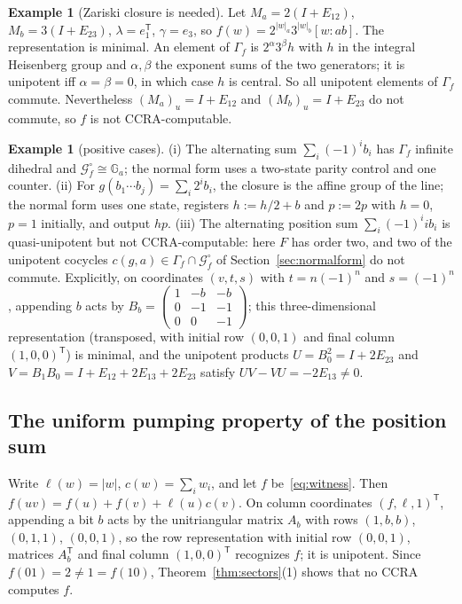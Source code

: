 \documentclass[acmlarge,screen,11pt,nonacm,natbib=false]{acmart}
\newcommand{\cG}{\mathcal{G}}
\theoremstyle{definition}
\newtheorem{example}[theorem]{Example}
\begin{document}
\begin{example}[Zariski closure is needed]\label{ex:heis}
Let $M_a=2(I+E_{12})$, $M_b=3(I+E_{23})$, $\lambda=e_1^{\mathsf T}$, $\gamma=e_3$, so $f(w)=2^{|w|_a}3^{|w|_b}[w:ab]$. The representation is minimal. An element of $\Gamma_f$ is $2^\alpha3^\beta h$ with $h$ in the integral Heisenberg group and $\alpha,\beta$ the exponent sums of the two generators; it is unipotent iff $\alpha=\beta=0$, in which case $h$ is central. So all unipotent elements of $\Gamma_f$ commute. Nevertheless $(M_a)_u=I+E_{12}$ and $(M_b)_u=I+E_{23}$ do not commute, so $f$ is not CCRA-computable.
\end{example}

\begin{example}[positive cases]\label{ex:positive}
(i) The alternating sum $\sum_i(-1)^ib_i$ has $\Gamma_f$ infinite dihedral and $\cG_f^\circ\cong\mathbb G_a$; the normal form uses a two-state parity control and one counter. (ii) For $g(b_1\cdots b_j)=\sum_i2^ib_i$, the closure is the affine group of the line; the normal form uses one state, registers $h:=h/2+b$ and $p:=2p$ with $h=0$, $p=1$ initially, and output $hp$. (iii) The alternating position sum $\sum_i(-1)^iib_i$ is quasi-unipotent but not CCRA-computable: here $F$ has order two, and two of the unipotent cocycles $c(g,a)\in\Gamma_f\cap\cG_f^\circ$ of Section~\ref{sec:normalform} do not commute. Explicitly, on coordinates $(v,t,s)$ with $t=n(-1)^n$ and $s=(-1)^n$, appending $b$ acts by $B_b=\left(\begin{smallmatrix}1&-b&-b\\0&-1&-1\\0&0&-1\end{smallmatrix}\right)$; this three-dimensional representation (transposed, with initial row $(0,0,1)$ and final column $(1,0,0)^{\mathsf T}$) is minimal, and the unipotent products $U=B_0^2=I+2E_{23}$ and $V=B_1B_0=I+E_{12}+2E_{13}+2E_{23}$ satisfy $UV-VU=-2E_{13}\ne0$.
\end{example}

\subsection{The uniform pumping property of the position sum}
Write $\ell(w)=|w|$, $c(w)=\sum_iw_i$, and let $f$ be~\eqref{eq:witness}. Then $f(uv)=f(u)+f(v)+\ell(u)c(v)$. On column coordinates $(f,\ell,1)^\mathsf{T}$, appending a bit $b$ acts by the unitriangular matrix $A_b$ with rows $(1,b,b)$, $(0,1,1)$, $(0,0,1)$, so the row representation with initial row $(0,0,1)$, matrices $A_b^{\mathsf T}$ and final column $(1,0,0)^{\mathsf T}$ recognizes $f$; it is unipotent. Since $f(01)=2\ne1=f(10)$, Theorem~\ref{thm:sectors}(1) shows that no CCRA computes $f$.
\end{document}

